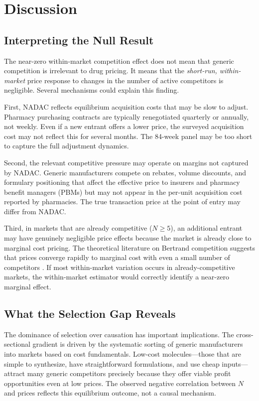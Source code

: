 \documentclass[12pt]{article}
\begin{document}
\section{Discussion}\label{sec:discussion}

\subsection{Interpreting the Null Result}

The near-zero within-market competition effect does not mean that generic competition is irrelevant to drug pricing. It means that the \emph{short-run, within-market} price response to changes in the number of active competitors is negligible. Several mechanisms could explain this finding.

First, NADAC reflects equilibrium acquisition costs that may be slow to adjust. Pharmacy purchasing contracts are typically renegotiated quarterly or annually, not weekly. Even if a new entrant offers a lower price, the surveyed acquisition cost may not reflect this for several months. The 84-week panel may be too short to capture the full adjustment dynamics.

Second, the relevant competitive pressure may operate on margins not captured by NADAC. Generic manufacturers compete on rebates, volume discounts, and formulary positioning that affect the effective price to insurers and pharmacy benefit managers (PBMs) but may not appear in the per-unit acquisition cost reported by pharmacies. The true transaction price at the point of entry may differ from NADAC.

Third, in markets that are already competitive ($N \geq 5$), an additional entrant may have genuinely negligible price effects because the market is already close to marginal cost pricing. The theoretical literature on Bertrand competition suggests that prices converge rapidly to marginal cost with even a small number of competitors \citep{Tirole1988}. If most within-market variation occurs in already-competitive markets, the within-market estimator would correctly identify a near-zero marginal effect.

\subsection{What the Selection Gap Reveals}

The dominance of selection over causation has important implications. The cross-sectional gradient is driven by the systematic sorting of generic manufacturers into markets based on cost fundamentals. Low-cost molecules---those that are simple to synthesize, have straightforward formulations, and use cheap inputs---attract many generic competitors precisely because they offer viable profit opportunities even at low prices. The observed negative correlation between $N$ and prices reflects this equilibrium outcome, not a causal mechanism.
\end{document}
